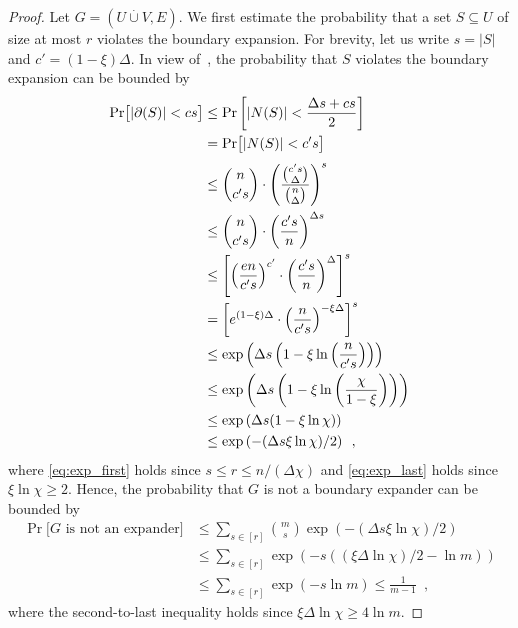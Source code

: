 \documentclass{theoretics}
\newcommand{\PROB}[2][]{\Pr_{#1} \left[ #2 \right]}
\newcommand{\Prob}[2][]{\Pr_{#1} \bigl[ #2 \bigr]}
\newcommand{\boundary}[1]{\ensuremath{\partial #1}}
\newcommand{\setsize}[1]{\lvert#1\rvert}
\newcommand{\disjointunion}{\overset{.}{\cup}}
\newcommand{\eqcomma}{\enspace ,}
\newcommand{\numpigeons}{m}
\newcommand{\numholes}{n}
\newcommand{\uniqueNeigh}[2][]{\boundary_{{#1}} ({#2})}
\newcommand{\diff}{\xi}
\newcommand{\GdegMax}{\Delta}
\newcommand{\gdegmax}{\GdegMax}
\numberwithin{equation}{section}
\begin{document}
\begin{proof}
  Let $G= (U \disjointunion V, E)$. We 
  first estimate the probability 
  that a set $S \subseteq U$ of size at most $r$ violates 
  the boundary expansion. 
  For brevity, let us write
  $s = \setsize{ S }$
  and $c' = (1 - \diff)\GdegMax$.
  In view of~, 
  the probability that $S$ violates the boundary expansion
  can be bounded by
  \begin{subequations}
  \begin{align}
    \Prob{ \setsize{ \uniqueNeigh{S} } < cs } 
    &\le \PROB{ \setsize{ N(S) } < \frac{\GdegMax s + cs}{2}  }\\
    &= \Prob{ \setsize{ N(S) } < c's  }\\
    &\leq
      \binom{\numholes}{ c's } \cdot
      \left(
      \frac
      {\binom{c' s}{\gdegmax}}
      {\binom{\numholes}{\gdegmax}}
      \right)^s \\
    &\le  \binom{\numholes}{c's}  \cdot
    \left( \frac{ c's }{\numholes} \right)^{\GdegMax s}\\
    &\le 
     \left[
     \left( \frac{e\numholes}{c's} \right)^{c'} \cdot
     \left( \frac{c's}{\numholes} \right)^{\GdegMax}
     \right]^s
    \\
    &= 
    \left[
    {e}^{(1-\diff)\GdegMax} \cdot
    \left( \frac{\numholes}{c' s} \right)^{-\diff \GdegMax }
    \right]^s\\
    &\le \exp \left(\GdegMax s \left(1 -\diff \ln \left(\frac{\numholes}{c's}\right)\right) \right)\\ \label{eq:exp_first}
    &\le \exp \left(\GdegMax s \left(1 -\diff \ln \left(\frac{\chi}{1-\diff}\right)\right) \right)\\
    &\le \exp \left(\GdegMax s (1 -\diff \ln {\chi}) \right)\\ \label{eq:exp_last}
    &\le \exp \left(- (\GdegMax s \diff \ln {\chi}) /2 \right) \eqcomma
  \end{align}
  \end{subequations}
  where \eqref{eq:exp_first} holds since
    $
    s \leq r \leq \numholes / (\gdegmax \chi)
    $
    and
    \eqref{eq:exp_last} holds since $\diff \ln \chi \ge 2$.
  Hence, the probability that $G$ is not a boundary expander
  can be bounded by
  \begin{align}
\nonumber
    \Prob{G \text{ is not an expander}} &\le 
    \sum_{s \in [r]}\binom{\numpigeons}{s} \exp( - (\GdegMax s \diff \ln \chi)/2)\\
    &\le \sum_{s \in [r]} \exp (-s ((\diff \GdegMax \ln \chi)/2 - \ln
      \numpigeons))\\
\nonumber
    &\le \sum_{s \in [r]} \exp( -s \ln \numpigeons) \le \frac{1}{\numpigeons - 1} \eqcomma 
  \end{align}
where the second-to-last inequality holds since $\diff \GdegMax \ln \chi \ge 4 \ln \numpigeons$.
\end{proof}
\end{document}
